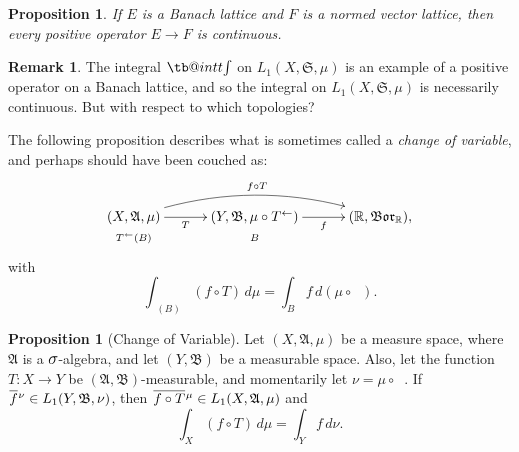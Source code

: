 \documentclass[
twoside=true,
paper=letter,
fontsize=9pt,
pagesize=auto,
leqno,
openany,
headsepline,
overfullrule,
]{scrbook}
\makeatletter
\theoremstyle{plain}
\theoremstyle{plain}
\newtheorem{prop}[thm]{Proposition}
\theoremstyle{definition}
\newtheorem{rmk}[thm]{Remark}
\theoremstyle{bfnoteitalic}
\newtheorem{propboldnote}[thm]{Proposition}
\theoremstyle{bfnoteroman}
\newcommand{\sigalg}[1]{\mathfrak{#1}}
\newcommand{\borel}{\mathfrak{Bor}}
\newcommand{\textsigma}{\hbox{\large{$\sigma$}}\kern-1pt}
\newcommand{\preimage}[1]{\mathop{#1^{\leftarrow}}}
\newcommand{\R}{\mathbb{R}}
\newcommand{\semiring}{\sigalg{S}}
\newcommand{\sigmaalgebra}{\sigalg{A}}
\newcommand{\sigmaalgebraii}{\sigalg{B}}
\newcommand{\function}{f}
\newcommand{\measurespace}{X}
\newcommand{\measurespaceii}{Y}
\newcommand{\measure}{\mu}
\newcommand{\measureii}{\nu}
\newcommand{\setii}{B}
\newcommand*\xbar[1]{%
   \hbox{%
     \vbox{%
       \hrule height 0.4pt %
       \kern0.4ex%
       \hbox{%
         \ensuremath{#1}%
       }%
     }%
   }%
}
\newcommand\tint{\mathop{\mathpalette\tb@int{t}}\!\int}
\newcommand\tb@int[2]{%
  \sbox\z@{$\m@th#1\int$}%
  \if#2t%
    \rlap{\hbox to\wd\z@{%
      \hfil
      \vrule width .35em height \dimexpr\ht\z@+1.4pt\relax depth -\dimexpr\ht\z@+1pt\relax
      \kern.05em %
    }}
  \else
    \rlap{\hbox to\wd\z@{%
      \vrule width .35em height -\dimexpr\dp\z@+1pt\relax depth \dimexpr\dp\z@+1.4pt\relax
      \hfil
    }}
  \fi
}
\newcommand{\lebclass}[1]{\hspace{.5pt}\xbar{#1}\hspace{0.5pt}}
\newcommand{\ellclass}[2]{\lebclass{#1}^{#2}}
\newcommand{\inducedint}{\tint}
\makeatother
\begin{document}
\begin{prop}\label{integral_continuous}
If $E$ is a Banach lattice and $F$ is a normed vector lattice, then every positive operator $E\to F$ is continuous.
\end{prop}



\begin{rmk}
The integral $\inducedint$ on $L_1(\measurespace, \semiring, \measure)$ is an example of a positive operator on a Banach lattice, and so the integral on $L_1(\measurespace, \semiring, \measure)$ is necessarily continuous. But with respect to which topologies?
\end{rmk}







The following proposition describes what is sometimes called a \emph{change of variable}, and perhaps should have been couched as:
\[
\xymatrix@R=0pt@C=30pt{ 
(\measurespace,\sigmaalgebra,\measure)
\ar[r]_-{T} \ar@/^16pt/[rr]^{f\circ T}
& (\measurespaceii,\sigmaalgebraii,\measure\circ\preimage{T})
\ar[r]_-{\function}
& (\R,\borel_\R), \\
\scriptstyle{\preimage{T}(\setii)} & \scriptstyle{\setii} & \\
}
\]
with
\[
\int_{\preimage{T}(\setii)} (\function\circ T) \, d\measure
= \int_\setii \function \, d (\measure\circ\preimage{T}).
\]


\begin{propboldnote}[Change of Variable]\label{change_of_variable}
Let $(\measurespace,\sigmaalgebra,\measure)$ be a measure space, where $\sigmaalgebra$ is a $\textsigma$-algebra, and let $(\measurespaceii, \sigmaalgebraii)$ be a measurable space.  Also, let the function $T:\measurespace\to\measurespaceii$ be $(\sigmaalgebra, \sigmaalgebraii)$\hyp{}measurable, and momentarily let 
$\measureii = \measure\circ\preimage{T}$.
If
$\ellclass{\function}{\measureii} 
\in L_1(\measurespaceii, \sigmaalgebraii, \measureii)$, 
then 
$\ellclass{\function\circ T}{\measure}
\in
L_1(\measurespace, \sigmaalgebra, \measure)$
and
\[
\int_\measurespace (f\circ T) \, d\measure
= \int_\measurespaceii f \, d\measureii.
\]
\end{propboldnote}
\end{document}
